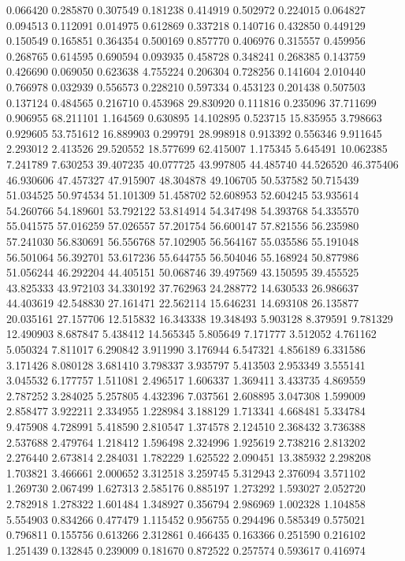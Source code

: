 0.066420
0.285870
0.307549
0.181238
0.414919
0.502972
0.224015
0.064827
0.094513
0.112091
0.014975
0.612869
0.337218
0.140716
0.432850
0.449129
0.150549
0.165851
0.364354
0.500169
0.857770
0.406976
0.315557
0.459956
0.268765
0.614595
0.690594
0.093935
0.458728
0.348241
0.268385
0.143759
0.426690
0.069050
0.623638
4.755224
0.206304
0.728256
0.141604
2.010440
0.766978
0.032939
0.556573
0.228210
0.597334
0.453123
0.201438
0.507503
0.137124
0.484565
0.216710
0.453968
29.830920
0.111816
0.235096
37.711699
0.906955
68.211101
1.164569
0.630895
14.102895
0.523715
15.835955
3.798663
0.929605
53.751612
16.889903
0.299791
28.998918
0.913392
0.556346
9.911645
2.293012
2.413526
29.520552
18.577699
62.415007
1.175345
5.645491
10.062385
7.241789
7.630253
39.407235
40.077725
43.997805
44.485740
44.526520
46.375406
46.930606
47.457327
47.915907
48.304878
49.106705
50.537582
50.715439
51.034525
50.974534
51.101309
51.458702
52.608953
52.604245
53.935614
54.260766
54.189601
53.792122
53.814914
54.347498
54.393768
54.335570
55.041575
57.016259
57.026557
57.201754
56.600147
57.821556
56.235980
57.241030
56.830691
56.556768
57.102905
56.564167
55.035586
55.191048
56.501064
56.392701
53.617236
55.644755
56.504046
55.168924
50.877986
51.056244
46.292204
44.405151
50.068746
39.497569
43.150595
39.455525
43.825333
43.972103
34.330192
37.762963
24.288772
14.630533
26.986637
44.403619
42.548830
27.161471
22.562114
15.646231
14.693108
26.135877
20.035161
27.157706
12.515832
16.343338
19.348493
5.903128
8.379591
9.781329
12.490903
8.687847
5.438412
14.565345
5.805649
7.171777
3.512052
4.761162
5.050324
7.811017
6.290842
3.911990
3.176944
6.547321
4.856189
6.331586
3.171426
8.080128
3.681410
3.798337
3.935797
5.413503
2.953349
3.555141
3.045532
6.177757
1.511081
2.496517
1.606337
1.369411
3.433735
4.869559
2.787252
3.284025
5.257805
4.432396
7.037561
2.608895
3.047308
1.599009
2.858477
3.922211
2.334955
1.228984
3.188129
1.713341
4.668481
5.334784
9.475908
4.728991
5.418590
2.810547
1.374578
2.124510
2.368432
3.736388
2.537688
2.479764
1.218412
1.596498
2.324996
1.925619
2.738216
2.813202
2.276440
2.673814
2.284031
1.782229
1.625522
2.090451
13.385932
2.298208
1.703821
3.466661
2.000652
3.312518
3.259745
5.312943
2.376094
3.571102
1.269730
2.067499
1.627313
2.585176
0.885197
1.273292
1.593027
2.052720
2.782918
1.278322
1.601484
1.348927
0.356794
2.986969
1.002328
1.104858
5.554903
0.834266
0.477479
1.115452
0.956755
0.294496
0.585349
0.575021
0.796811
0.155756
0.613266
2.312861
0.466435
0.163366
0.251590
0.216102
1.251439
0.132845
0.239009
0.181670
0.872522
0.257574
0.593617
0.416974
